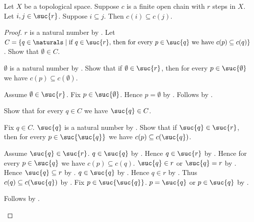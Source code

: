 \begin{theorem}\label{finite_open_chain_monotone}
    Let $X$ be a topological space.
    Suppose $c$ is a finite open chain with $r$ steps in $X$.
    Let $i,j\in\suc{r}$.
    Suppose $i\subseteq j$.
    Then $c(i)\subseteq c(j)$.
\end{theorem}
\begin{proof}
    $r$ is a natural number by .
    Let $C=\{q\in\naturals\mid
        \text{if $q\in\suc{r}$, then
            for every $p\in\suc{q}$ we have $c(p)\subseteq c(q)$}\}$.
    Show that $\emptyset\in C$.
    \begin{subproof}
        $\emptyset$ is a natural number by .
        Show that if $\emptyset\in\suc{r}$, then
            for every $p\in\suc{\emptyset}$ we have
                $c(p)\subseteq c(\emptyset)$.
        \begin{subproof}
            Assume $\emptyset\in\suc{r}$.
            Fix $p\in\suc{\emptyset}$.
            Hence $p=\emptyset$ by .
            Follows by .
        \end{subproof}
    \end{subproof}
    Show that for every $q\in C$ we have $\suc{q}\in C$.
    \begin{subproof}
        Fix $q\in C$.
        $\suc{q}$ is a natural number by .
        Show that if $\suc{q}\in\suc{r}$, then
            for every $p\in\suc{\suc{q}}$ we have
                $c(p)\subseteq c(\suc{q})$.
        \begin{subproof}
            Assume $\suc{q}\in\suc{r}$.
            $q\in\suc{q}$ by .
            Hence $q\in\suc{r}$
                by
                .
            Hence for every $p\in\suc{q}$ we have
                $c(p)\subseteq c(q)$.
            $\suc{q}\in r$ or $\suc{q}=r$ by .
            Hence $\suc{q}\subseteq r$
                by
                .
            $q\in\suc{q}$ by .
            Hence $q\in r$ by .
            Thus $c(q)\subseteq c(\suc{q})$
                by .
            Fix $p\in\suc{\suc{q}}$.
            $p=\suc{q}$ or $p\in\suc{q}$ by .
            \begin{byCase}
                    Follows by .

\end{byCase}
\end{subproof}
\end{subproof}
\end{proof}
